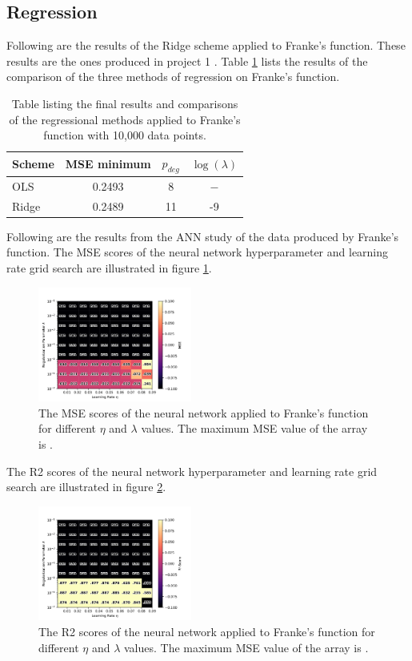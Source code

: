     \subsection{Regression}
    	Following are the results of the Ridge scheme applied to Franke's function. These results are the ones produced in project 1 \cite{5}. Table \ref{tab:conclusion_table_Frankes} lists the results of the comparison of the three methods of regression on Franke's function.
    	\begin{table}[H]
    		\centering
    		\begin{tabular}[t]{l@{\hskip 0.3in}c@{\hskip 0.3in}c@{\hskip 0.2in}c}
    			\toprule
    			Scheme & MSE minimum & $p_{deg}$ & $\log(\lambda)$ \\
    			\midrule
    			OLS & 0.2493 & 8 & $-$\\
    			Ridge & 0.2489 & 11 & -9\\
    			\bottomrule
    		\end{tabular}
	    	\caption{Table listing the final results and comparisons of the regressional methods applied to Franke's function with 10,000 data points.}
    		\label{tab:conclusion_table_Frankes}
    	\end{table}
    	Following are the results from the ANN study of the data produced by Franke's function. The MSE scores of the neural network hyperparameter and learning rate grid search are illustrated in figure \ref{fig:ff_mse}.
    	\begin{figure}[H]
    		\centering
    		\includegraphics[width=0.45\textwidth]{figures/ff_res_0.pdf}
    		\caption{The MSE scores of the neural network applied to Franke's function for different $\eta$ and $\lambda$ values. The maximum MSE value of the array is .}
    		\label{fig:ff_mse}
    	\end{figure}
	    The R2 scores of the neural network hyperparameter and learning rate grid search are illustrated in figure \ref{fig:ff_r2}.
    	\begin{figure}[H]
    		\centering
    		\includegraphics[width=0.45\textwidth]{figures/ff_res_1.pdf}
    		\caption{The R2 scores of the neural network applied to Franke's function for different $\eta$ and $\lambda$ values. The maximum MSE value of the array is .}
    		\label{fig:ff_r2}
    	\end{figure}